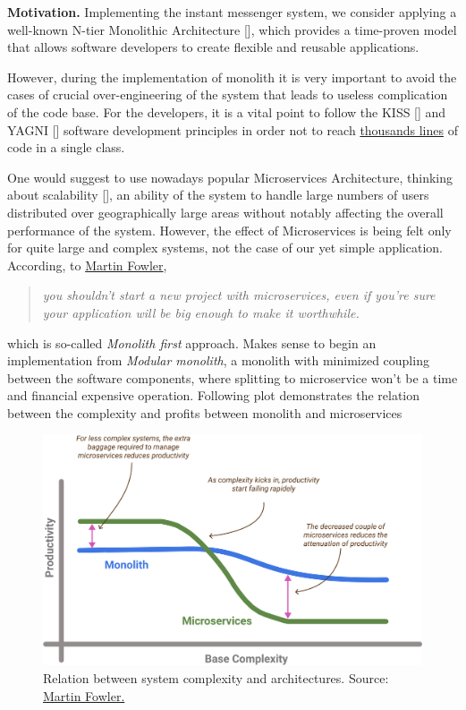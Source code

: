 \textbf{Motivation.} Implementing the instant messenger system, we consider applying a well-known N-tier
Monolithic Architecture [\cite{bucchiarone2018monolithic}], which provides a time-proven model that allows software
developers to create flexible and reusable applications.

However, during the implementation of monolith it is very important to avoid the cases of crucial over-engineering
of the system that leads to useless complication of the code base.
For the developers, it is a vital point to follow the KISS [\cite{alwin2016kiss}] and YAGNI [\cite{da2018evolution}]
software development principles in order not to reach
\href{https://github.com/smartstore/SmartStoreNET/blob/4.x/src/Presentation/SmartStore.Web/Controllers/CatalogHelper.cs}
{thousands lines}
of code in a single class.

One would suggest to use nowadays popular Microservices Architecture, thinking about scalability [\cite{brataas2004exploring}],
an ability of the system to handle large numbers of users distributed over geographically large areas without
notably affecting the overall performance of the system.
However, the effect of Microservices is being felt only for quite large and complex systems,
not the case of our yet simple application.
According, to \href{https://martinfowler.com/bliki/MonolithFirst.html}{Martin Fowler},
\begin{quote}
    \textit{you shouldn't start a new project with microservices, even if you're sure your application will be big enough to
    make it worthwhile.}
\end{quote}
which is so-called \textit{Monolith first} approach.
Makes sense to begin an implementation from \textit{Modular monolith}, a monolith with minimized coupling between the
software components, where splitting to microservice won't be a time and financial expensive operation.
Following plot demonstrates the relation between the complexity and profits between monolith and microservices

\begin{figure}[H]
    \centering
    \includegraphics[width=1\textwidth]{Pictures/Monolith_vs_Microservice.pdf}
    \caption{Relation between system complexity and architectures.
    Source: \href{https://martinfowler.com/bliki/MicroservicePremium.html}{Martin Fowler.}}
    \label{fig:monolith_vs_microservice}
\end{figure}

